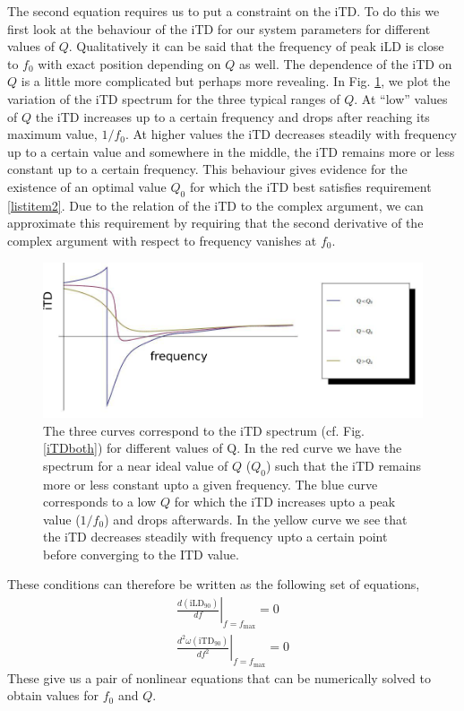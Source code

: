 The second equation requires us to put a constraint on the iTD. To do this we first look at the behaviour of the iTD for our system parameters for
different values of $Q$.
Qualitatively it can be said that the frequency of peak iLD is close to $f_0$ with exact position depending on $Q$ as well.
The dependence of the iTD on $Q$ is a little more complicated but perhaps more revealing. In Fig. \ref{itdQdependence}, we plot the variation of the 
iTD spectrum for the three typical ranges of $Q$. At ``low'' values of $Q$ the iTD increases up to a certain frequency and drops
 after reaching its maximum value, $1/f_0$. At higher values the iTD decreases steadily with frequency up to a certain value and
 somewhere in the middle, the iTD remains more or less constant up to a certain frequency. This behaviour gives evidence for the existence of an optimal value $Q_0$ 
for which the iTD  best satisfies requirement \ref{listitem2}. Due to the relation of the iTD to the complex argument, we can approximate this requirement by requiring that the second derivative of
the complex argument with respect to frequency vanishes at $f_0$.

\begin{figure}[ht!]
\centering
  \includegraphics[width=.7\linewidth]{Diagrams/Plots/paramtest/allthree2.png}
  \caption[Dependence of iTD spectrum on Quality Factor]{The three curves correspond to the iTD spectrum (cf. Fig. \ref{iTDboth}) for different values
  of Q. In the red curve we have the spectrum for a near ideal value of $Q$ ($Q_0$) such that the iTD remains more or less constant upto
  a given frequency. The blue curve corresponds to a low $Q$ for which the iTD increases upto a peak value ($1/f_0$) and drops afterwards.
  In the yellow curve we see that the iTD decreases steadily with frequency upto a certain point before converging to the ITD value.}
  \label{itdQdependence}
\end{figure}
\noindent These conditions can therefore be written as the following set of equations,
\begin{align}
 \left.\frac{d (\mbox{iLD}_{90})}{df}\right|_{f=f_{\mathrm{max}}}=0\\
 \left.\frac{d^2 \omega (\mbox{iTD}_{90})}{df^2}\right|_{f=f_{\mathrm{max}}}=0
\end{align}
These give us a pair of nonlinear equations that can be numerically solved to obtain values for $f_0$ and $Q$.

